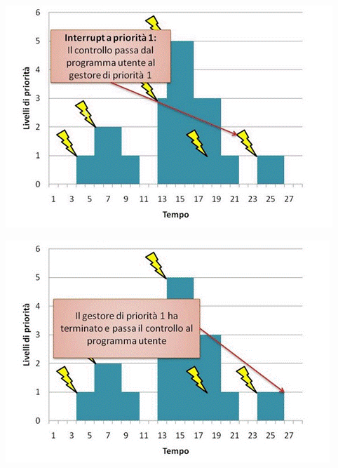\documentclass[a4paper,12pt, oneside]{book}
\begin{document}
\begin{center}
  \includegraphics[scale = 0.6]{img/int12.png}
\end{center}
\begin{center}
  \includegraphics[scale = 0.6]{img/int13.png}
\end{center}
\newpage
\end{document}
